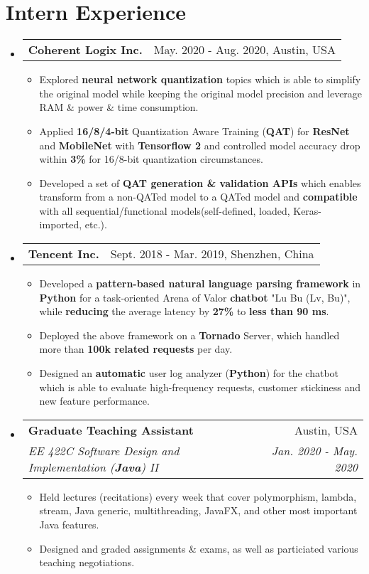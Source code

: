 \documentclass[letterpaper,11pt]{article}
\makeatletter
\newcommand{\resumeItem}[1]{
  \item\small{
    {#1}
  }
}
\newcommand{\resumeSubheading}[4]{
  \vspace{-1pt}\item
    \begin{tabular*}{0.97\textwidth}[t]{l@{\extracolsep{\fill}}r}
      \textbf{#1} & #2 \\
      \textit{\small#3} & \textit{\small #4} \\
    \end{tabular*}\vspace{-5pt}
}
\newcommand{\internSubheading}[2]{
	\vspace{-1pt}\item
	\begin{tabular*}{0.97\textwidth}[t]{l@{\extracolsep{\fill}}r}
		\textbf{#1} & #2 \\
	\end{tabular*}\vspace{-5pt}
}
\newcommand{\resumeSubHeadingListStart}{\begin{itemize}[leftmargin=*]}
\newcommand{\resumeSubHeadingListEnd}{\end{itemize}}
\newcommand{\resumeItemListStart}{\begin{itemize}}
\newcommand{\resumeItemListEnd}{\end{itemize}\vspace{-5pt}}
\makeatother
\begin{document}
\section{Intern Experience}
  \resumeSubHeadingListStart
  	\internSubheading
  	{Coherent Logix Inc.}{May. 2020 - Aug. 2020, Austin, USA}
  	\resumeItemListStart
  	\resumeItem
  	{Explored \textbf{neural network quantization} topics which is able to simplify the original model while keeping the original model precision and leverage RAM \& power \& time consumption.}
  	\resumeItem
  	{Applied \textbf{16/8/4-bit} Quantization Aware Training (\textbf{QAT}) for \textbf{ResNet} and \textbf{MobileNet} with \textbf{Tensorflow 2} and controlled model accuracy drop within \textbf{3\%} for 16/8-bit quantization circumstances.}
  	\resumeItem
  	{Developed a set of \textbf{QAT generation \& validation APIs} which enables transform from a non-QATed model to a QATed model and \textbf{compatible} with all sequential/functional models(self-defined, loaded, Keras-imported, etc.).}
  	\resumeItemListEnd
  	
    \internSubheading
      {Tencent Inc.}{Sept. 2018 - Mar. 2019, Shenzhen, China}
      \resumeItemListStart
      	\resumeItem
      	  {Developed a \textbf{pattern-based natural language parsing framework} in \textbf{Python} for a task-oriented Arena of Valor \textbf{chatbot} "Lu Bu (Lv, Bu)", while \textbf{reducing} the average latency by \textbf{27\%} to \textbf{less than 90 ms}.}
      	\resumeItem
          {Deployed the above framework on a \textbf{Tornado} Server, which handled more than \textbf{100k related requests} per day. }
        \resumeItem
          {Designed an \textbf{automatic} user log analyzer (\textbf{Python}) for the chatbot which is able to evaluate high-frequency requests, customer stickiness and new feature performance.}
      \resumeItemListEnd
      \resumeSubheading
      {Graduate Teaching Assistant}{Austin, USA}
      {EE 422C Software Design and Implementation (\textbf{Java}) II }{Jan. 2020 - May. 2020}
      \resumeItemListStart
      \resumeItem
      {Held lectures (recitations) every week that cover polymorphism, lambda, stream, Java generic, multithreading, JavaFX, and other most important Java features. }
      \resumeItem{Designed and graded assignments \& exams, as well as particiated various teaching negotiations.}
      
      \resumeItemListEnd
      \resumeSubHeadingListEnd
      
\end{document}
